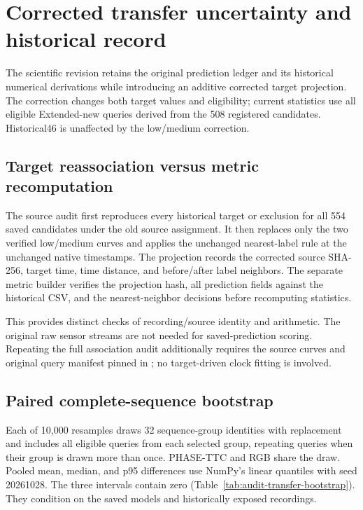 \clearpage
\section{Corrected transfer uncertainty and historical record}
\label{app:derived-transfer}

The scientific revision retains the original prediction ledger and its historical numerical derivations while introducing an additive corrected target projection. The correction changes both target values and eligibility; current statistics use all \AuditTransferCount{} eligible Extended-new queries derived from the 508 registered candidates. Historical46 is unaffected by the low/medium correction. 



\subsection{Target reassociation versus metric recomputation}
The source audit first reproduces every historical target or exclusion for all 554 saved candidates under the old source assignment. It then replaces only the two verified low/medium curves and applies the unchanged nearest-label rule at the unchanged native timestamps. The projection records the corrected source SHA-256, target time, time distance, and before/after label neighbors. The separate metric builder verifies the projection hash, all prediction fields against the historical CSV, and the nearest-neighbor decisions before recomputing statistics.

This provides distinct checks of recording/source identity and arithmetic. The original raw sensor streams are not needed for saved-prediction scoring. Repeating the full association audit additionally requires the source curves and original query manifest pinned in ; no target-driven clock fitting is involved.

\subsection{Paired complete-sequence bootstrap}
Each of 10,000 resamples draws 32 sequence-group identities with replacement and includes all eligible queries from each selected group, repeating queries when their group is drawn more than once. PHASE-TTC and RGB share the draw. Pooled mean, median, and p95 differences use NumPy's linear quantiles with seed 20261028. The three intervals contain zero (Table~\ref{tab:audit-transfer-bootstrap}). They condition on the saved models and historically exposed recordings.

